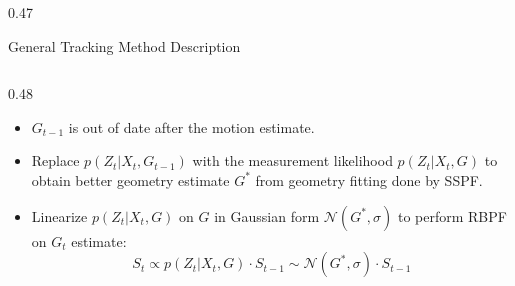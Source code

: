 \documentclass[final,hyperref={pdfpagelabels=false}]{beamer}
\begin{document}
\begin{frame}[t]
\begin{columns}[t]
\begin{column}{0.47\textwidth}
\begin{block}{General Tracking Method Description}
\begin{columns}[t]
\begin{column}{0.48\textwidth}
\begin{itemize}
			\begin{equation}
			\small
			\nonumber
			 \begin{array}{rcl}
			  S_t & = & p(G_t|X^t,V^t,G^{t-1},Z^t) \\
			      & \propto & p(Z_t,G_{t-1},X_t,G_t|X^{t-1},V^t,G^{t-2},Z^{t-1}) \\
			      & = & p(Z_t|X^t,V^t,G^t,Z^{t-1}) \\
			      &   & \cdot p(G_{t-1}|X^t,V^t,G_t,G^{t-2},Z^{t-1}) \\
			      &   & \cdot p(X_t|X^{t-1},V^t,G_t,G^{t-2},Z^{t-1}) \\
			      &   & \cdot p(G_t|X^{t-1},V^t,G^{t-2},Z^{t-1}) \\
			      & \propto & p(Z_t|X_t,G_{t-1}) \cdot S_{t-1}
			 \end{array}
			\end{equation}
			\item $G_{t-1}$ is out of date after the motion estimate.
			\item Replace $p(Z_t|X_t,G_{t-1})$ with the measurement likelihood $p(Z_t|X_t,G)$ to obtain better geometry estimate $G^*$ from geometry fitting done by SSPF.
			\item Linearize $p(Z_t|X_t,G)$ on $G$ in Gaussian form $\mathcal{N}(G^*,\sigma)$ to perform RBPF on $G_t$ estimate:
			$$S_t \propto p(Z_t|X_t,G) \cdot S_{t-1} \sim \mathcal{N}(G^*,\sigma) \cdot S_{t-1}$$
		\end{itemize}
	\end{column}
\end{columns}


\end{block}
\end{column}
\end{columns}
\end{frame}
\end{document}
